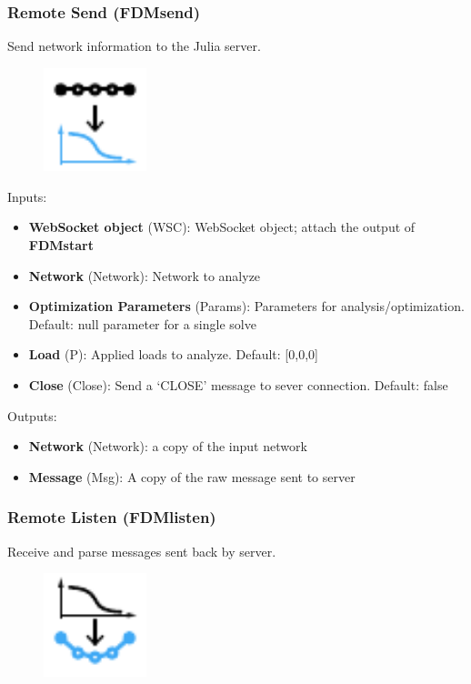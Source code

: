 \subsubsection{Remote Send (FDMsend)} \label{FDMsend}
Send network information to the Julia server.

\begin{figure}[h]
    \centering
    \includegraphics[width=3cm]{Figures/send}
\end{figure}

Inputs:
\begin{itemize}
    \setlength\itemsep{0.05em}
    \item \textbf{WebSocket object} (WSC): WebSocket object; attach the output of \textbf{FDMstart}
    \item \textbf{Network} (Network): Network to analyze
    \item \textbf{Optimization Parameters} (Params): Parameters for analysis/optimization. {\color{gray} Default: null parameter for a single solve}
    \item \textbf{Load} (P): Applied loads to analyze. {\color{gray} Default: [0,0,0]}
    \item \textbf{Close} (Close): Send a `CLOSE' message to sever connection. {\color{gray} Default: false}  
\end{itemize}

Outputs:
\begin{itemize}
    \setlength\itemsep{0.05em}
    \item \textbf{Network} (Network): a copy of the input network
    \item \textbf{Message} (Msg): A copy of the raw message sent to server
\end{itemize}

\subsubsection{Remote Listen (FDMlisten)} \label{FDMlisten}
Receive and parse messages sent back by server.

\begin{figure}[h]
    \centering
    \includegraphics[width=3cm]{Figures/listen}
\end{figure}


